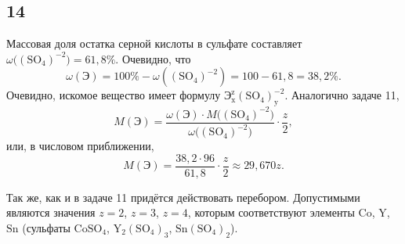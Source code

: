 \subsection{14}

Массовая доля остатка серной кислоты в сульфате составляет $\omega\bigl(\mathrm{(SO_4)^{-2}}\bigr)=61{,}8\%$. Очевидно, что
\[
\omega(\text{Э})=100\%-\omega\left(\mathrm{(SO_4)^{-2}}\right)=100-61{,}8=38{,}2\%.
\]
Очевидно, искомое вещество имеет формулу $\mathrm{\text{Э}_x^{z}(SO_4)_y^{-2}}$. Аналогично задаче 11,
\[
M(\text{Э})=\frac{\omega(\text{Э})\cdot M\bigl(\mathrm{(SO_4)^{-2}}\bigr)}{\omega\bigl(\mathrm{(SO_4)^{-2}}\bigr)}\cdot\frac{z}{2},
\]
или, в числовом приближении,
\[
M(\text{Э})=\frac{38{,}2\cdot96}{61{,}8}\cdot\frac{z}{2}\approx 29{,}670z.
\]

Так же, как и в задаче 11 придётся действовать перебором. Допустимыми являются значения $z=2$, $z=3$, $z=4$, которым соответствуют элементы $\mathrm{Co}$, $\mathrm{Y}$, $\mathrm{Sn}$ \big(сульфаты $\mathrm{CoSO_4}$, $\mathrm{Y_2(SO_4)_3}$, $\mathrm{Sn(SO_4)_2}$\big).